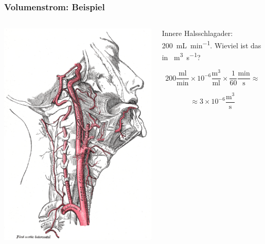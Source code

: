 \documentclass{beamer}
\begin{document}
\begin{frame}
\frametitle{Volumenstrom: Beispiel}

\begin{columns}[c]
\begin{column}{5cm}

\begin{center}
\includegraphics[width=\textwidth]{halsarterien.png}
\end{center}


\end{column}

\begin{column}{5cm}

Innere Halsschlagader: \SI{200}{\milli\liter\per\minute}. Wieviel ist das in \SI{}{\cubic\meter\per\second}?

\pause

\[
200 \frac{\text{ml}}{\text{min}} \times 10^{-6} \frac{\text{m}^3}{\text{ml}} \times \frac{1}{60} \frac{\text{min}}{\text{s}} \approx
\]

\[
\approx 3\times 10^{-6} \frac{\text{m}^3}{\text{s}}
\]

\end{column}



\end{columns}

\end{frame}
\end{document}
